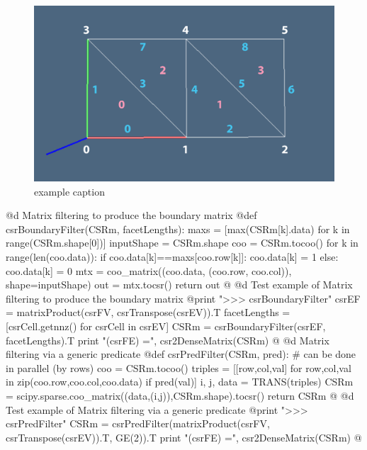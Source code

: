 \documentclass[11pt,oneside]{article}	%
\begin{document}
\begin{figure}[htbp] %
   \centering
   \includegraphics[width=0.6\linewidth]{images/2complex} 
   \caption{example caption}
   \label{fig:2complex}
\end{figure}
@d Matrix filtering to produce the boundary matrix
@{def csrBoundaryFilter(CSRm, facetLengths):
    maxs = [max(CSRm[k].data) for k in range(CSRm.shape[0])]
    inputShape = CSRm.shape
    coo = CSRm.tocoo()
    for k in range(len(coo.data)):
        if coo.data[k]==maxs[coo.row[k]]: coo.data[k] = 1
        else: coo.data[k] = 0
    mtx = coo_matrix((coo.data, (coo.row, coo.col)), shape=inputShape)
    out = mtx.tocsr()
    return out
@}
@d Test example of Matrix filtering to produce the boundary matrix
@{print "\n>>> csrBoundaryFilter"
csrEF = matrixProduct(csrFV, csrTranspose(csrEV)).T
facetLengths = [csrCell.getnnz() for csrCell in csrEV]
CSRm = csrBoundaryFilter(csrEF, facetLengths).T
print "\ncsrMaxFilter(csrFE) =\n", csr2DenseMatrix(CSRm)
@}
@d Matrix filtering via a generic predicate
@{def csrPredFilter(CSRm, pred):
	# can be done in parallel (by rows)
	coo = CSRm.tocoo()
	triples = [[row,col,val] for row,col,val 
				in zip(coo.row,coo.col,coo.data) if pred(val)]
	i, j, data = TRANS(triples)
	CSRm = scipy.sparse.coo_matrix((data,(i,j)),CSRm.shape).tocsr()
	return CSRm
@}
@d Test example of Matrix filtering via a generic predicate
@{print "\n>>> csrPredFilter"
CSRm = csrPredFilter(matrixProduct(csrFV, csrTranspose(csrEV)).T, GE(2)).T
print "\nccsrPredFilter(csrFE) =\n", csr2DenseMatrix(CSRm)
@}
\end{document}
